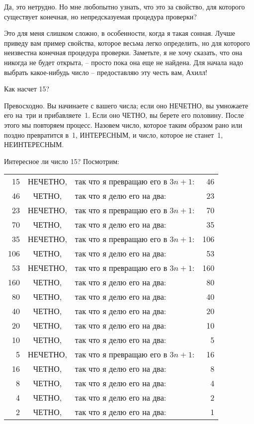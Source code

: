 \documentclass[../main.tex]{subfiles}
\begin{document}
\begin{dialogue}
 Да, это нетрудно. Но мне любопытно узнать, что это за свойство, для которого существует конечная, но непредсказуемая процедура проверки?

 Это для меня слишком сложно, в особенности, когда я такая сонная. Лучше приведу вам пример свойства, которое весьма легко определить, но для которого неизвестна конечная процедура проверки. Заметьте, я не хочу сказать, что она никогда не будет открыта, \--- просто пока она еще не найдена. Для начала надо выбрать какое-нибудь число \--- предоставляю эту честь вам, Ахилл!

 Как насчет 15?

 Превосходно. Вы начинаете с вашего числа; если оно НЕЧЕТНО, вы умножаете его на~три и прибавляете~1. Если оно ЧЕТНО, вы берете его половину. После этого мы повторяем процесс. Назовем число, которое таким образом рано или поздно превратится в~1, ИНТЕРЕСНЫМ, и число, которое не станет~1, НЕИНТЕРЕСНЫМ.

 Интересное ли число 15? Посмотрим:

\begingroup
\setlength{\tabcolsep}{0.5em}
\setlength{\LTpre}{\medskipamount}
\setlength{\LTpost}{\medskipamount}
\begin{longtable}{rclr}
    15  & {НЕЧЕТНО,} & {так что я превращаю его в $3n + 1$:} & 46 \\
    46  & {ЧЕТНО,}   & {так что я делю его на два:} & 23 \\
    23  & {НЕЧЕТНО,} & {так что я превращаю его в $3n + 1$:} & 70 \\
    70  & {ЧЕТНО,}   & {так что я делю его на два:} & 35 \\
    35  & {НЕЧЕТНО,} & {так что я превращаю его в $3n + 1$:} & 106 \\
    106 & {ЧЕТНО,}   & {так что я делю его на два:} & 53 \\
    53  & {НЕЧЕТНО,} & {так что я превращаю его в $3n + 1$:} & 160 \\
    160 & {ЧЕТНО,}   & {так что я делю его на два:} & 80 \\
    80  & {ЧЕТНО,}   & {так что я делю его на два:} & 40 \\
    40  & {ЧЕТНО,}   & {так что я делю его на два:} & 20 \\
    20  & {ЧЕТНО,}   & {так что я делю его на два:} & 10 \\
    10  & {ЧЕТНО,}   & {так что я делю его на два:} & 5 \\
    5   & {НЕЧЕТНО,} & {так что я превращаю его в $3n + 1$:} & 16 \\
    16  & {ЧЕТНО,}   & {так что я делю его на два:} & 8 \\
    8   & {ЧЕТНО,}   & {так что я делю его на два:} & 4 \\
    4   & {ЧЕТНО,}   & {так что я делю его на два:} & 2 \\
    2   & {ЧЕТНО,}   & {так что я делю его на два:} & 1
\end{longtable}
\endgroup


\end{dialogue}
\end{document}
